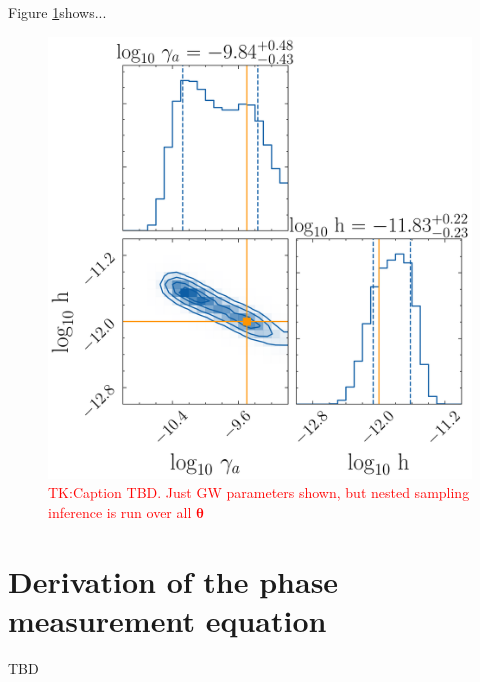\documentclass[fleqn,usenatbib,useAMS]{mnras}
\begin{document}
Figure \ref{fig:corner}shows...
\begin{figure}
	\includegraphics[width=\textwidth, height =\textwidth]{images/example_corner_plot} 	
	\caption{\textcolor{red}{TK:Caption TBD. Just GW parameters shown, but nested sampling inference is run over all $\boldsymbol{\theta}$}}
	\label{fig:corner}
\end{figure}















\newpage 
\appendix
\section{Derivation of the phase measurement equation}\label{appendix:measurement_equation_deriv}







TBD
\end{document}
